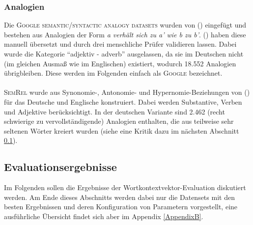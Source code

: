     \subsubsection{Analogien}

    Die \textsc{Google semantic/syntactic analogy datasets} wurden von (\cite{mikolov2013efficient}) eingefügt und bestehen
    aus Analogien der Form \emph{a verhält sich zu a' wie b zu b'}. (\cite{koper2015multilingual}) haben diese manuell übersetzt und durch
    drei menschliche Prüfer validieren lassen. Dabei wurde die Kategorie ``adjektiv - adverb'' ausgelassen, da sie
    im Deutschen nicht (im gleichen Ausmaß wie im Englischen) existiert, wodurch 18.552 Analogien übrigbleiben. Diese werden im Folgenden einfach als
    \textsc{Google} bezeichnet.\\ \\
    \textsc{SemRel} wurde aus Synonomie-, Antonomie- und Hypernomie-Beziehungen von (\cite{koper2015multilingual}) für das Deutsche und Englische
    konstruiert. Dabei werden Substantive, Verben und Adjektive berücksichtigt. In der deutschen Variante sind 2.462
    (recht schwierige zu vervollständigende) Analogien enthalten, die aus teilweise sehr seltenen Wörter kreiert wurden
    (siehe eine Kritik dazu im nächsten Abschnitt \ref{sec:evalerg}).

  \subsection{Evaluationsergebnisse}\label{sec:evalerg}

  Im Folgenden sollen die Ergebnisse der Wortkontextvektor-Evaluation diskutiert werden. Am Ende dieses Abschnitts werden dabei
  nur die Datensets mit den besten Ergebnissen und deren Konfiguration von Parametern vorgestellt, eine ausführliche
  Übersicht findet sich aber im Appendix \ref{AppendixB}.\\


